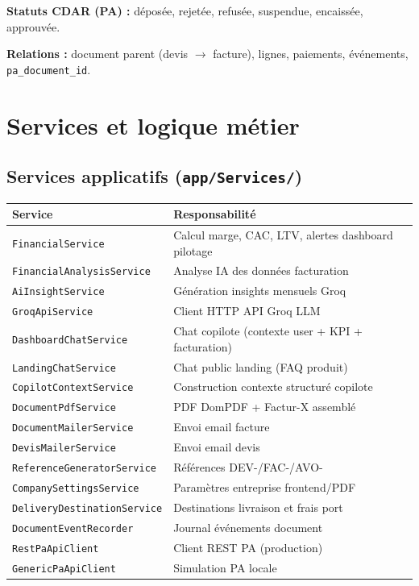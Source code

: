 \documentclass[11pt,a4paper]{report}
\newcommand{\filepath}[1]{\texttt{\small #1}}
\begin{document}
\textbf{Statuts CDAR (PA) :} déposée, rejetée, refusée, suspendue, encaissée, approuvée.

\textbf{Relations :} document parent (devis $\rightarrow$ facture), lignes, paiements, événements, \texttt{pa\_document\_id}.

\chapter{Services et logique métier}

\section{Services applicatifs (\filepath{app/Services/})}

\begin{longtable}{@{}p{4.2cm}p{9.3cm}@{}}
\toprule
\textbf{Service} & \textbf{Responsabilité} \\
\midrule
\endhead
\texttt{FinancialService} & Calcul marge, CAC, LTV, alertes dashboard pilotage \\
\texttt{FinancialAnalysisService} & Analyse IA des données facturation \\
\texttt{AiInsightService} & Génération insights mensuels Groq \\
\texttt{GroqApiService} & Client HTTP API Groq LLM \\
\texttt{DashboardChatService} & Chat copilote (contexte user + KPI + facturation) \\
\texttt{LandingChatService} & Chat public landing (FAQ produit) \\
\texttt{CopilotContextService} & Construction contexte structuré copilote \\
\texttt{DocumentPdfService} & PDF DomPDF + Factur-X assemblé \\
\texttt{DocumentMailerService} & Envoi email facture \\
\texttt{DevisMailerService} & Envoi email devis \\
\texttt{ReferenceGeneratorService} & Références DEV-/FAC-/AVO- \\
\texttt{CompanySettingsService} & Paramètres entreprise frontend/PDF \\
\texttt{DeliveryDestinationService} & Destinations livraison et frais port \\
\texttt{DocumentEventRecorder} & Journal événements document \\
\texttt{RestPaApiClient} & Client REST PA (production) \\
\texttt{GenericPaApiClient} & Simulation PA locale \\
\bottomrule
\end{longtable}
\end{document}
